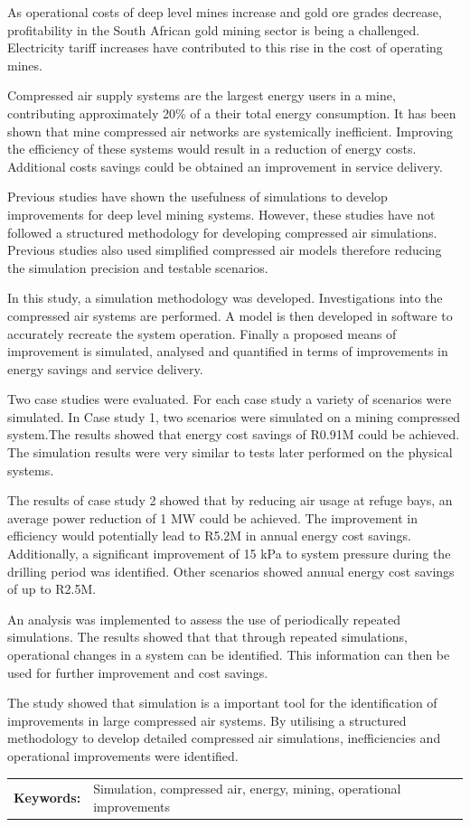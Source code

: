 \documentclass[12pt, english, oneside, open=any,draft=true ]{report}%
\begin{document}
	 As operational costs of deep level mines increase and gold ore grades decrease, profitability in the South African gold mining sector is being a challenged. Electricity tariff increases have contributed to this rise in the cost of operating mines. 
	 \par
	 Compressed air supply systems are the largest energy users in a mine, contributing approximately 20\% of a their total energy consumption. It has been shown that mine compressed air networks are systemically inefficient. Improving the efficiency of these systems would result in a reduction of energy costs. Additional costs savings could be obtained an improvement in service delivery. 
	 \par
	Previous studies have shown the usefulness of simulations to develop improvements for deep level mining systems. However, these studies have not followed a structured methodology for developing compressed air simulations. Previous studies also used simplified compressed air models therefore reducing the simulation precision and testable scenarios. 
	\par
	 In this study, a simulation methodology was developed. Investigations into the compressed air systems are performed. A model is then developed in software to accurately recreate the system operation. Finally a proposed means of improvement is simulated, analysed and quantified in terms of improvements in energy savings and service delivery.
	 \par
	 Two case studies were evaluated. For each case study a variety of scenarios were simulated. In Case study 1, two scenarios were simulated on a mining compressed system.The results showed that energy cost savings of R0.91M could be achieved. The simulation results were very similar to tests later performed on the physical systems.
	 \par 
	 The results of case study 2 showed that by reducing air usage at refuge bays, an average power reduction of 1 MW could be achieved. The improvement in efficiency would potentially lead to R5.2M in annual energy cost savings. Additionally, a significant improvement of 15 kPa to system pressure during the drilling period was identified. Other scenarios showed annual energy cost savings of up to R2.5M.
	 \par 
	 An analysis was implemented to assess the use of periodically repeated simulations. The results showed that that through repeated simulations, operational changes in a system can be identified. This information can then be used for further improvement and cost savings.
	 \par
	 The study showed that simulation is a important tool for the identification of improvements in large compressed air systems. By utilising a structured methodology to develop detailed compressed air simulations, inefficiencies and operational improvements were identified.   
	 \par
	\begin{tabular}{p{2.35cm}p{13.35cm}}
		\textbf{Keywords:} & Simulation,  compressed air, energy, mining, operational improvements  \\
	\end{tabular}
\clearpage
\end{document}
